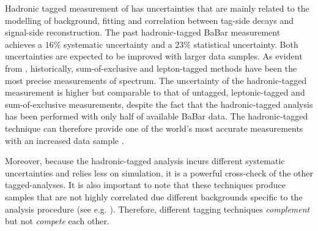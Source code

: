 Hadronic tagged measurement of \BtoXsgamma has uncertainties that are mainly related to the modelling of \BB background, \Mbc fitting and correlation between tag-side decays and signal-side reconstruction.
The past hadronic-tagged BaBar measurement \cite{BaBar:2007yhb} achieves a $16\%$ systematic uncertainty and a $23\%$ statistical uncertainty.
Both uncertainties are expected to be improved with larger data samples.
As evident from , historically, sum-of-exclusive and lepton-tagged methods have been the most precise measurements of \BtoXsgamma spectrum.
The uncertainty of the hadronic-tagged measurement is higher but comparable to that of untagged, leptonic-tagged and sum-of-exclusive measurements, despite the fact that the hadronic-tagged analysis has been performed with only half of available BaBar data.
The hadronic-tagged technique can therefore provide one of the world's most accurate measurements with an increased data sample \cite{Belle-II:2022cgf}.

Moreover, because the hadronic-tagged analysis incurs different systematic uncertainties and relies less on simulation, it is a powerful cross-check of the other tagged-analyses.
It is also important to note that these techniques produce samples that are not highly correlated due different backgrounds specific to the analysis procedure (see e.g. \cite{Belle:2009nth}).
Therefore, different tagging techniques \textit{complement} but not \textit{compete} each other.




